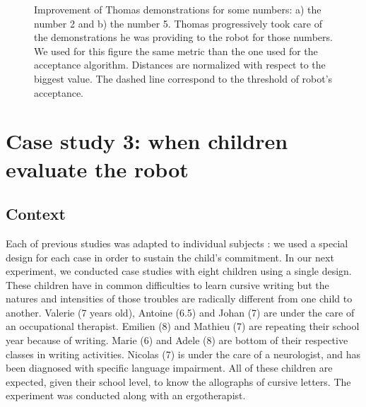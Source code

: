 \documentclass[conference]{IEEEtran}
\begin{document}
\begin{figure}
    \centering
    \caption{\small Improvement of Thomas demonstrations for some numbers: a) the number 2 and b) the number 5. Thomas progressively took care of the demonstrations he was providing to the robot for those numbers. We used for this figure the same metric than the one used for the acceptance algorithm. Distances are normalized with respect to the biggest value. The dashed line correspond to the threshold of robot's acceptance.}

    \label{Thomas_progress}
\end{figure}

\section{Case study 3: when children evaluate the robot}\label{auto}

\subsection{Context}

Each of previous studies was adapted to individual subjects : we used a special
design for each case in order to sustain the child's commitment.
In our next experiment, we conducted case studies with eight children using a single design. These children have in common difficulties to learn
cursive writing but the natures and intensities of those troubles are radically
different from one child to another. Valerie (7 years old), Antoine (6.5) and
Johan (7) are under the care of an
occupational therapist. Emilien (8) and Mathieu (7) are repeating their school year
because of writing. Marie (6) and Adele (8) are bottom of their respective
classes in writing activities. Nicolas (7) is under the care of a neurologist, and
has been diagnosed with specific language impairment. All of these children are
expected, given their school level, to know the allographs of
cursive letters. The experiment was conducted along with an ergotherapist. 
\end{document}
